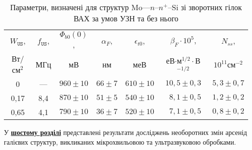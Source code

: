 \begin{table}[hb]
\caption{Параметри, визначені для структур Mo---$n$--$n^+$--Si зі зворотних гілок ВАХ за умов УЗН та без нього}
\label{tabSDBParZv}
\centering
\begin{tabular}{|c|c|c|c|c|c|c|}
\hline
$W_\mathtt{US}$, &$f_\mathtt{US}$,&$\Phi_{b0}(0)$,&$\alpha_F$,&$\epsilon_{t0}$,&$\beta_F\cdot10^{5}$,&$N_{ss}$,\\
Вт/см$^2$&МГц&мВ&нм&меВ&еВ$\cdot$м$^{1/2}\cdot$В$^{-1/2}$&$10^{11}$см$^{-2}$\\\hline
0&---&$960\pm10$&$66\pm7$&$610\pm10$&$10,5\pm0,3$&$5,3\pm0,7$\\\hline
0,17&8,4&$870\pm10$&$51\pm5$&$540\pm10$&$\;\:8,1\pm0,5$&$1,2\pm0,2$\\\hline
0,65&4,1&$790\pm10$&$36\pm7$&$520\pm10$&$\;\:7,1\pm0,5$&$0,8\pm0,2$\\\hline
\end{tabular}
\end{table}

У  \underline{\textbf{шостому розділі}} представлені результати досліджень необоротних змін арсенід галієвих структур, викликаних мікрохвильовою та ультразвуковою обробками.

